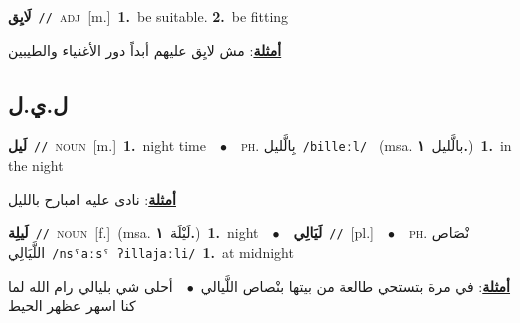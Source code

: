 \documentclass[10pt,a4paper,twoside]{article} %
\begin{document}
\begin{multicols}{2}
{\setlength\topsep{0pt}\textbf{\foreignlanguage{arabic}{لَايِق}}\ {\color{gray}\texttt{//}\color{black}}\ \textsc{adj}\ [m.]\ \textbf{1.}~be suitable.  \textbf{2.}~be fitting\  \begin{flushright}\color{gray}\foreignlanguage{arabic}{\textbf{\underline{\foreignlanguage{arabic}{أمثلة}}}: مش لايِق عليهم أبداً دور الأغنياء والطيبين}\end{flushright}\color{black}} \vspace{2mm}

\vspace{-3mm}
\subsection*{\color{blue}\foreignlanguage{arabic}{ل.ي.ل}\color{blue}{}} 

{\setlength\topsep{0pt}\textbf{\foreignlanguage{arabic}{لَيل}}\ {\color{gray}\texttt{//}\color{black}}\ \textsc{noun}\ [m.]\ \textbf{1.}~night time\ \ $\bullet$\ \ \textsc{ph.} \color{gray} \foreignlanguage{arabic}{بِالَّليل}\color{black}\ {\color{gray}\texttt{/{\sffamily billeːl}/}\color{black}}\ \color{gray} (msa. \foreignlanguage{arabic}{بالَّليل}~\foreignlanguage{arabic}{\textbf{١.}})\color{black}\ \textbf{1.}~in the night\  \begin{flushright}\color{gray}\foreignlanguage{arabic}{\textbf{\underline{\foreignlanguage{arabic}{أمثلة}}}: نادى عليه امبارح بالليل}\end{flushright}\color{black}} \vspace{2mm}

{\setlength\topsep{0pt}\textbf{\foreignlanguage{arabic}{لَيلِة}}\ {\color{gray}\texttt{//}\color{black}}\ \textsc{noun}\ [f.]\ \color{gray}(msa. \foreignlanguage{arabic}{لَيْلَة}~\foreignlanguage{arabic}{\textbf{١.}})\color{black}\ \textbf{1.}~night\ \ $\bullet$\ \ \setlength\topsep{0pt}\textbf{\foreignlanguage{arabic}{لَيَالِي}}\ {\color{gray}\texttt{//}\color{black}}\ [pl.]\ \ $\bullet$\ \ \textsc{ph.} \color{gray} \foreignlanguage{arabic}{نْصَاص اللَّيَالِي}\color{black}\ {\color{gray}\texttt{/{\sffamily nsˤaːsˤ ʔillajaːli}/}\color{black}}\ \textbf{1.}~at midnight\  \begin{flushright}\color{gray}\foreignlanguage{arabic}{\textbf{\underline{\foreignlanguage{arabic}{أمثلة}}}: في مرة بتستحي طالعة من بيتها بنْصاص اللَّيالي\ $\bullet$\ \  أحلى شي بليالي رام الله لما كنا اسهر عظهر الحيط}\end{flushright}\color{black}} \vspace{2mm}


\end{multicols}
\end{document}
